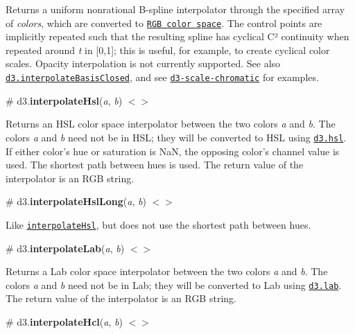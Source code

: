 Returns a uniform nonrational B-\/spline interpolator through the specified array of {\itshape colors}, which are converted to \href{https://github.com/d3/d3-color#rgb}{\tt R\+GB color space}. The control points are implicitly repeated such that the resulting spline has cyclical C² continuity when repeated around {\itshape t} in \mbox{[}0,1\mbox{]}; this is useful, for example, to create cyclical color scales. Opacity interpolation is not currently supported. See also \href{#interpolateBasisClosed}{\tt d3.\+interpolate\+Basis\+Closed}, and see \href{https://github.com/d3/d3-scale-chromatic}{\tt d3-\/scale-\/chromatic} for examples.

\label{_interpolateHsl}%
\# d3.{\bfseries interpolate\+Hsl}({\itshape a}, {\itshape b}) \href{https://github.com/d3/d3-interpolate/blob/master/src/hsl.js}{\tt $<$$>$}



Returns an H\+SL color space interpolator between the two colors {\itshape a} and {\itshape b}. The colors {\itshape a} and {\itshape b} need not be in H\+SL; they will be converted to H\+SL using \href{https://github.com/d3/d3-color#hsl}{\tt d3.\+hsl}. If either color’s hue or saturation is NaN, the opposing color’s channel value is used. The shortest path between hues is used. The return value of the interpolator is an R\+GB string.

\label{_interpolateHslLong}%
\# d3.{\bfseries interpolate\+Hsl\+Long}({\itshape a}, {\itshape b}) \href{https://github.com/d3/d3-interpolate/blob/master/src/hsl.js#L21}{\tt $<$$>$}



Like \href{#interpolateHsl}{\tt interpolate\+Hsl}, but does not use the shortest path between hues.

\label{_interpolateLab}%
\# d3.{\bfseries interpolate\+Lab}({\itshape a}, {\itshape b}) \href{https://github.com/d3/d3-interpolate/blob/master/src/lab.js}{\tt $<$$>$}



Returns a Lab color space interpolator between the two colors {\itshape a} and {\itshape b}. The colors {\itshape a} and {\itshape b} need not be in Lab; they will be converted to Lab using \href{https://github.com/d3/d3-color#lab}{\tt d3.\+lab}. The return value of the interpolator is an R\+GB string.

\label{_interpolateHcl}%
\# d3.{\bfseries interpolate\+Hcl}({\itshape a}, {\itshape b}) \href{https://github.com/d3/d3-interpolate/blob/master/src/hcl.js}{\tt $<$$>$}



